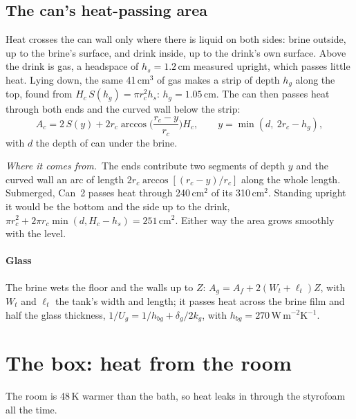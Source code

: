 \documentclass[11pt,a4paper]{article}
\newcommand{\where}{\par\noindent\textit{Where it comes from.}\ }
\begin{document}
\subsection{The can's heat-passing area}
\label{sec:canarea}
Heat crosses the can wall only where there is liquid on both sides: brine outside, up to the brine's
surface, and drink inside, up to the drink's own surface. Above the drink is gas, a headspace of
$h_s = 1.2$\,cm measured upright, which passes little heat. Lying down, the same 41\,cm$^3$ of gas makes a
strip of depth $h_g$ along the top, found from $H_c\,S(h_g) = \pi r_c^2 h_s$: $h_g = 1.05$\,cm. The can
then passes heat through both ends and the curved wall below the strip:
\begin{equation}
A_c = 2\,S(y) + 2 r_c \arccos\!\Big(\frac{r_c - y}{r_c}\Big) H_c,\qquad y = \min(d,\ 2r_c - h_g),
\label{eq:canarea}
\end{equation}
with $d$ the depth of can under the brine. \where The ends contribute two segments of depth $y$ and
the curved wall an arc of length $2r_c\arccos[(r_c - y)/r_c]$ along the whole length. Submerged, Can~2
passes heat through 240\,cm$^2$ of its 310\,cm$^2$. Standing upright it would be the bottom and the side up
to the drink, $\pi r_c^2 + 2\pi r_c\min(d, H_c - h_s) = 251$\,cm$^2$. Either way the area grows smoothly
with the level.

\paragraph{Glass} The brine wets the floor and the walls up to $Z$: $A_g = A_f + 2(W_t + \ell_t)Z$, with
$W_t$ and $\ell_t$ the tank's width and length; it passes heat across the brine film and half the glass
thickness, $1/U_g = 1/h_{bg} + \delta_g/2k_g$, with $h_{bg} = 270$\,W\,m$^{-2}$K$^{-1}$.

\section{The box: heat from the room}
\label{sec:box}

The room is 48\,K warmer than the bath, so heat leaks in through the styrofoam all the time.
\end{document}

